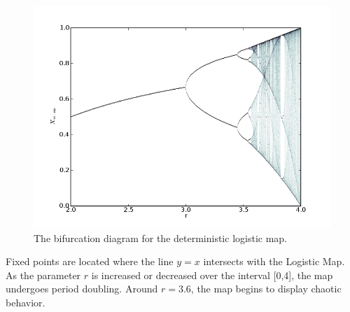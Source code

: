 \documentclass[12pt]{article}
\begin{document}
\begin{figure}[H]
	\begin{center}
		\includegraphics[scale=0.3]{det_bif}
\caption{The bifurcation diagram for the deterministic logistic
  map.}
	\end{center}
\end{figure}
Fixed points are located where the line $y=x$ intersects with the
Logistic Map. As the parameter $r$ is increased or decreased over the
interval [0,4], the map undergoes period doubling. Around $r=3.6$, the
map begins to display chaotic behavior.
\end{document}
